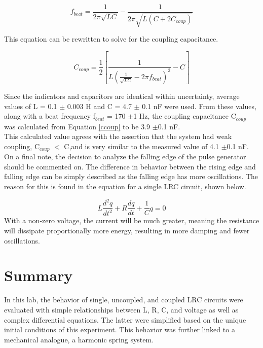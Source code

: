 \documentclass[aps,prl,reprint]{revtex4-2}
\begin{document}
\begin{equation} 
f_{beat} = \frac{1}{2\pi\sqrt{LC}}-\frac{1}{2\pi\sqrt{L(C+2C_{coup})}}
\label{fbeat}
\end{equation}

This equation can be rewritten to solve for the coupling capacitance.

\begin{equation} 
C_{coup} = \frac{1}{2}[\frac{1}{L(\frac{1}{\sqrt{LC}}-2\pi f_{beat})^2}-C]
\label{ccoup}
\end{equation}

Since the indicators and capacitors are identical within 
uncertainty, average values of L = 0.1 $\pm$ 0.003 H and C = 4.7 $\pm$ 0.1
nF were used. From these values, along with a beat frequency
f$_{beat}$ = 170 $\pm$1 Hz, the coupling capacitance C$_{coup}$ was 
calculated from Equation \ref{ccoup} to be 3.9 $\pm$0.1 nF.\\

This calculated value agrees with the assertion that the system had 
weak coupling, C$_{coup}$  $<$ C,and is very similar to the measured 
value of 4.1 $\pm$0.1 nF. \\

On a final note, the decision to analyze the falling edge of the pulse
generator should be commented on. The difference in behavior between
the rising edge and falling edge can be simply described as the falling
edge has more oscillations. The reason for this is found in the equation
for a single LRC circuit, shown below.

\begin{equation} 
	L \frac{d^2q}{dt^2} + R\frac{dq}{dt} + \frac{1}{C} q=0
\label{ccoup}
\end{equation}
With a non-zero voltage, the current will be much greater, meaning the
resistance will dissipate proportionally more energy, resulting in
more damping and fewer oscillations.



\section{Summary}

In this lab, the behavior of single, uncoupled, and coupled LRC circuits
were evaluated with simple relationships between L, R, C, and voltage
as well as complex differential equations. The latter were simplified
based on the unique initial conditions of this experiment. This behavior
was further linked to a mechanical analogue, a harmonic spring system. \\
\end{document}
